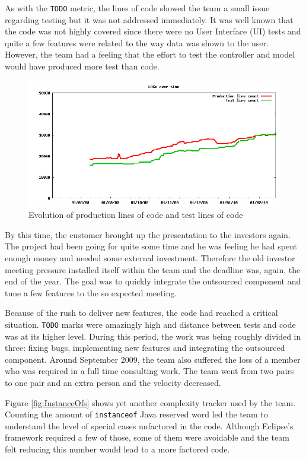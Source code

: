 \documentclass[lnbip]{svmultln}
\begin{document}
As with the \texttt{TODO} metric, the lines of code showed the team a
small issue regarding testing but it was not addressed
immediately. It was well known that the code was not highly covered
since there were no User Interface (UI) tests and quite a few features
were related to the way data was shown to the user. However, the team
had a feeling that the effort to test the controller and model would
have produced more test than code.

\begin{figure}[hbt]
  \centerline{
    \includegraphics[width=120mm]{LOCs.png}
  }
  \caption{Evolution of production lines of code and test lines of
    code}
  \label{fig:LOCs}
\end{figure}

By this time, the customer brought up the presentation to the
investors again. The project had been going for quite some time and he
was feeling he had spent enough money and needed some external
investment. Therefore the old investor meeting pressure installed
itself within the team and the deadline was, again, the end of the
year. The goal was to quickly integrate the outsourced component and
tune a few features to the so expected meeting.

Because of the rush to deliver new features, the code
had reached a critical situation. \texttt{TODO} marks were amazingly
high and distance between tests and code was at its higher level.
During this period, the
work was being roughly divided in three: fixing bugs, implementing new
features and integrating the outsourced component. Around September 2009, the
team also suffered the loss of a member who was required in a full
time consulting work. The team went from two pairs to one pair and an
extra person and the velocity decreased.

Figure \ref{fig:InstanceOfs} shows yet another complexity tracker
used by the team. Counting the amount of \texttt{instanceof} Java
reserved word led the team to understand the level of special cases
unfactored in the code. Although Eclipse's framework required a few of
those, some of them were avoidable and the team felt reducing this
number would lead to a more factored code.
\end{document}
